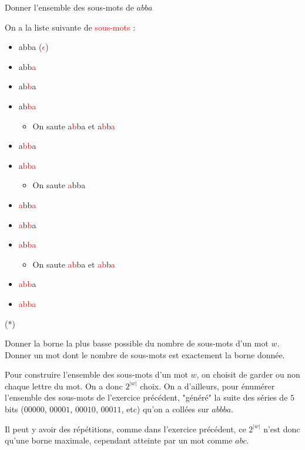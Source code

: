 \begin{exercice}
Donner l'ensemble des sous-mots de $abba$
\end{exercice}


\begin{correction*}
On a la liste suivante de \textcolor{red}{sous-mots} : 

\begin{itemize}
\item abba (\textcolor{red}{$\epsilon$})
\item abb\textcolor{red}{a}
\item ab\textcolor{red}{b}a
\item ab\textcolor{red}{ba}
\begin{itemize} \item On saute a\textcolor{red}{b}ba et a\textcolor{red}{b}b\textcolor{red}{a} \end{itemize}
\item a\textcolor{red}{bb}a
\item a\textcolor{red}{bba}
\begin{itemize} \item On saute \textcolor{red}{a}bba \end{itemize}
\item \textcolor{red}{a}bb\textcolor{red}{a}
\item \textcolor{red}{a}b\textcolor{red}{b}a
\item \textcolor{red}{a}b\textcolor{red}{ba}
\begin{itemize} \item On saute \textcolor{red}{ab}ba et \textcolor{red}{ab}b\textcolor{red}{a} \end{itemize}
\item \textcolor{red}{abb}a
\item \textcolor{red}{abba}
\end{itemize}
\end{correction*}



\begin{exercice}\label{exssmot} (*)

Donner la borne la plus basse possible du nombre de sous-mots d'un mot $w$. Donner un mot dont le nombre de sous-mots est exactement la borne donnée.
\end{exercice}

\begin{correction*}
Pour construire l'ensemble des sous-mots d'un mot $w$, on choisit de garder ou non chaque lettre du mot. On a donc $2^{|w|}$ choix. On a d'ailleurs, pour énumérer l'ensemble des sous-mots de l'exercice précédent, "généré" la suite des séries de $5$ bits ($00000$, $00001$, $00010$, $00011$, etc) qu'on a collées sur $abbba$.

Il peut y avoir des répétitions, comme dans l'exercice précédent, ce $2^{|w|}$ n'est donc qu'une borne maximale, cependant atteinte par un mot comme $abc$.
\end{correction*}

